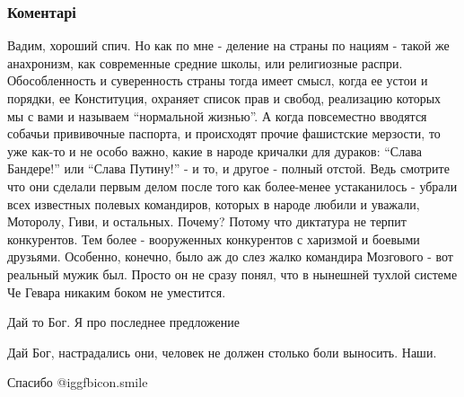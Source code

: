  
 
 
 
 
\subsubsection{Коментарі}
\label{sec:10_10_2021.fb.panov_vadim.moskva.pisatel.1.festival_zvezdy_nad_donbassom.cmt}

\begin{itemize} %

Вадим, хороший спич. Но как по мне - деление на страны по нациям - такой же
анахронизм, как современные средние школы, или религиозные распри.
Обособленность и суверенность страны тогда имеет смысл, когда ее устои и
порядки, ее Конституция, охраняет список прав и свобод, реализацию которых мы с
вами и называем \enquote{нормальной жизнью}. А когда повсеместно вводятся собачьи
прививочные паспорта, и происходят прочие фашистские мерзости, то уже как-то и
не особо важно, какие в народе кричалки для дураков: \enquote{Слава Бандере!} или
\enquote{Слава Путину!} - и то, и другое - полный отстой. Ведь смотрите что они сделали
первым делом после того как более-менее устаканилось - убрали всех известных
полевых командиров, которых в народе любили и уважали, Моторолу, Гиви, и
остальных. Почему? Потому что диктатура не терпит конкурентов. Тем более -
вооруженных конкурентов с харизмой и боевыми друзьями. Особенно, конечно, было
аж до слез жалко командира Мозгового - вот реальный мужик был. Просто он не
сразу понял, что в нынешней тухлой системе Че Гевара никаким боком не
уместится.

Дай то Бог. Я про последнее предложение

Дай Бог, настрадались они, человек не должен столько боли выносить. Наши.

Спасибо  @igg{fbicon.smile} 
\end{itemize} %
